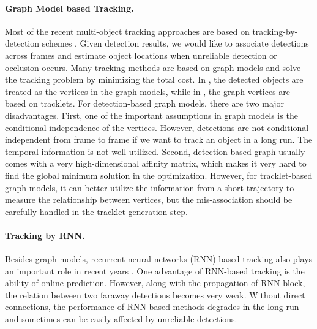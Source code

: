 \documentclass[10pt,twocolumn,letterpaper]{article}
\begin{document}
\paragraph{Graph Model based Tracking.} 
Most of the recent multi-object tracking approaches are based on tracking-by-detection schemes \cite{geiger20143d,zhang2013understanding}. Given detection results, we would like to associate detections across frames and estimate object locations when unreliable detection or occlusion occurs. 
Many tracking methods are based on graph models \cite{tang2017multiple,milan2016multi,tang2018single,tang2016multi,keuper2016multi,kumar2014multiple,choi2015near,tang2015subgraph,wen2014multiple} and solve the tracking problem by minimizing the total cost. 
In \cite{tang2017multiple,milan2016multi,tang2016multi,kumar2014multiple}, the detected objects are treated as the vertices in the graph models, while in \cite{tang2018single,choi2015near,tang2015subgraph,wen2014multiple}, the graph vertices are based on tracklets. 
For detection-based graph models, there are two major disadvantages. 
First, one of the important assumptions in graph models is the conditional independence of the vertices. However, detections are not conditional independent from frame to frame if we want to track an object in a long run. The temporal information is not well utilized.
Second, detection-based graph usually comes with a very high-dimensional affinity matrix, which makes it very hard to find the global minimum solution in the optimization. 
However, for tracklet-based graph models, it can better utilize the information from a short trajectory to measure the relationship between vertices, but the mis-association should be carefully handled in the tracklet generation step.

\paragraph{Tracking by RNN.} Besides graph models, recurrent neural networks (RNN)-based tracking also plays an important role in recent years \cite{sadeghian2017tracking,ma2018trajectory,kim2018multi,sadeghianend,lu2017online,milan2017online}. 
One advantage of RNN-based tracking is the ability of online prediction. 
However, along with the propagation of RNN block, the relation between two faraway detections becomes very weak. Without direct connections, the performance of RNN-based methods degrades in the long run and sometimes can be easily affected by unreliable detections.
\end{document}
